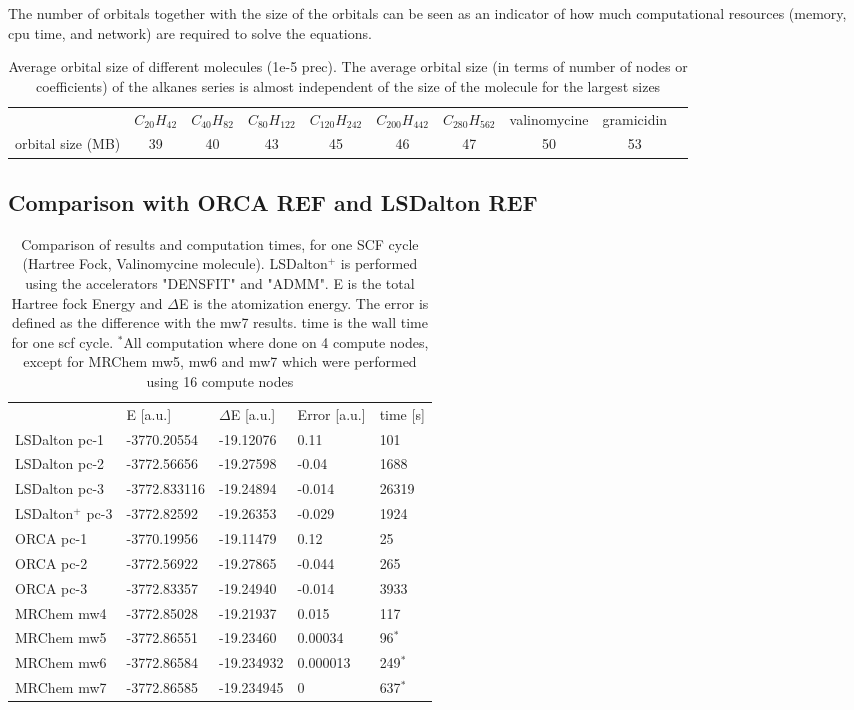 \documentclass{article}
\begin{document}
The number of orbitals together with the size of the orbitals can be seen as an indicator of how much computational resources (memory, cpu time, and network) are required to solve the equations. 

\begin{table}[t]
    \centering
    \begin{tabular}{cccccccccc}
& $C_{20}H_{42}$& $C_{40}H_{82}$& $C_{80}H_{122}$& $C_{120}H_{242}$&  $C_{200}H_{442}$ & $C_{280}H_{562}$ &valinomycine & gramicidin\\
orbital size (MB)  &  39 &  40   & 43  &  45  & 46 & 47 & 50 & 53\\
    \end{tabular}
    \caption{Average orbital size of different molecules (1e-5 prec). The average orbital size (in terms of number of nodes or coefficients) of the alkanes series is almost independent of the size of the molecule for the largest sizes}
    \label{tab:orbsizes}
\end{table}

\subsection{Comparison with ORCA REF and LSDalton REF}
\begin{table}[t]
    \centering
    \begin{tabular}{lllll}
     & E [a.u.] &$\Delta$E [a.u.]& Error [a.u.] & time [s]\\
    LSDalton pc-1 &-3770.20554&-19.12076&0.11&101\\
    LSDalton pc-2 &-3772.56656&-19.27598&-0.04&1688\\
    LSDalton pc-3 &-3772.833116&-19.24894&-0.014&26319\\
    LSDalton$^+$ pc-3 &-3772.82592&-19.26353&-0.029&1924\\
    ORCA pc-1 &-3770.19956&-19.11479&0.12&25\\
    ORCA pc-2 &-3772.56922&-19.27865&-0.044&265\\
    ORCA pc-3 &-3772.83357&-19.24940&-0.014&3933\\
    MRChem mw4&-3772.85028&-19.21937&0.015&117\\
    MRChem mw5&-3772.86551&-19.23460&0.00034& 96$^*$\\
    MRChem mw6&-3772.86584&-19.234932&0.000013&249$^*$\\
    MRChem mw7&-3772.86585&-19.234945&0&637$^*$\\
       \end{tabular}    
    \caption{Comparison of results and computation times, for one SCF cycle (Hartree Fock, Valinomycine molecule). LSDalton$^+$ is performed using the accelerators "DENSFIT" and "ADMM". E is the total Hartree fock Energy and $\Delta$E is the atomization energy. The error is defined as the difference with the mw7 results. time is the wall time for one scf cycle. $^*$All computation where done on 4 compute nodes, except for MRChem mw5, mw6 and mw7 which were performed using 16 compute nodes}
        \label{tab:MRC_ORCA_LSD}
\end{table}
\end{document}

